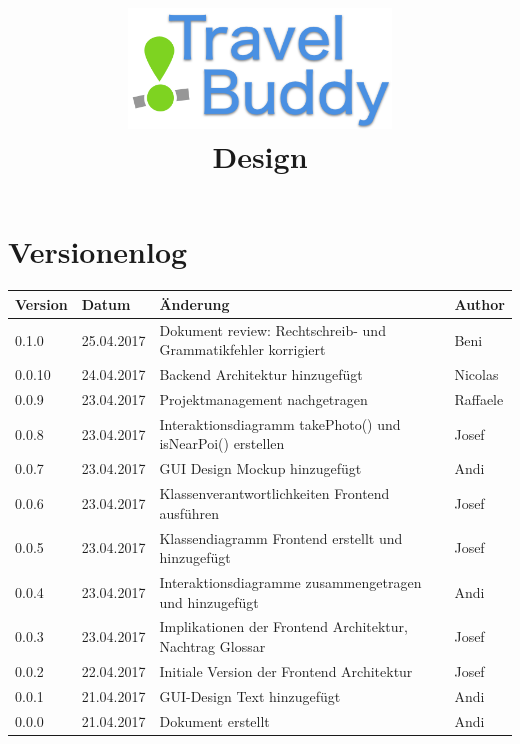 \documentclass[a4paper,10pt,xetex]{article}
\title{
  \includegraphics[width=7cm]{travel-buddy_white}\\[\bigskipamount]
  Design\\[\bigskipamount]
}
\author{\documentauthors}
\date{\parbox{\linewidth}{\centering%
  IT15TA ZH \hspace*{3cm} Gruppe 3\endgraf\bigskip
  Dokumentversion \documentversion, \documentdate\endgraf
}}
\begin{document}
\maketitle\newpage

{
\hypersetup{linkcolor=black}
\setcounter{tocdepth}{3}
\tableofcontents
}

\newpage

\section{Versionenlog}\label{versionenlog}

\tabulinesep=1.2mm

\begin{longtabu} to \textwidth { | l | l | X[l] | l | }
  \hline
  \textbf{Version} & \textbf{Datum} & \textbf{Änderung} & \textbf{Author} \\
  \hline
  \endhead

  0.1.0 & 25.04.2017 & Dokument review: Rechtschreib- und Grammatikfehler korrigiert & Beni \\
  \hline

  0.0.10 & 24.04.2017 & Backend Architektur hinzugefügt & Nicolas \\
  \hline

  0.0.9 & 23.04.2017 & Projektmanagement nachgetragen & Raffaele \\
  \hline

  0.0.8 & 23.04.2017 & Interaktionsdiagramm takePhoto() und isNearPoi() erstellen & Josef \\
  \hline

  0.0.7 & 23.04.2017 & GUI Design Mockup hinzugefügt & Andi \\
  \hline

  0.0.6 & 23.04.2017 & Klassenverantwortlichkeiten Frontend ausführen & Josef \\
  \hline

  0.0.5 & 23.04.2017 & Klassendiagramm Frontend erstellt und hinzugefügt & Josef \\
  \hline

  0.0.4 & 23.04.2017 & Interaktionsdiagramme zusammengetragen und hinzugefügt & Andi \\
  \hline

  0.0.3 & 23.04.2017 & Implikationen der Frontend Architektur, Nachtrag Glossar & Josef \\
  \hline

  0.0.2 & 22.04.2017 & Initiale Version der Frontend Architektur & Josef \\
  \hline

  0.0.1 & 21.04.2017 & GUI-Design Text hinzugefügt & Andi\\
  \hline

  0.0.0 & 21.04.2017 & Dokument erstellt & Andi\\
  \hline
\end{longtabu}
\newpage
\end{document}

